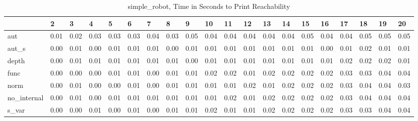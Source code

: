 \begin{table}
\centering
\caption{simple_robot, Time in Seconds to Print Reachability}
\label{simple_robot_states_time}
\begin{tabular}{llllllllllllllllllll}
\toprule
{} &     2 &     3 &     4 &     5 &     6 &     7 &     8 &     9 &    10 &    11 &    12 &    13 &    14 &    15 &    16 &    17 &    18 &    19 &    20 \\
\midrule
aut         &  0.01 &  0.02 &  0.03 &  0.03 &  0.03 &  0.04 &  0.03 &  0.05 &  0.04 &  0.04 &  0.04 &  0.04 &  0.04 &  0.05 &  0.04 &  0.04 &  0.05 &  0.05 &  0.05 \\
aut\_s       &  0.00 &  0.01 &  0.00 &  0.01 &  0.01 &  0.01 &  0.00 &  0.01 &  0.01 &  0.01 &  0.01 &  0.01 &  0.01 &  0.01 &  0.00 &  0.01 &  0.02 &  0.01 &  0.01 \\
depth       &  0.00 &  0.01 &  0.01 &  0.01 &  0.01 &  0.01 &  0.01 &  0.00 &  0.01 &  0.01 &  0.01 &  0.01 &  0.01 &  0.01 &  0.01 &  0.02 &  0.02 &  0.02 &  0.01 \\
func        &  0.00 &  0.00 &  0.00 &  0.01 &  0.01 &  0.00 &  0.01 &  0.01 &  0.02 &  0.02 &  0.01 &  0.02 &  0.02 &  0.02 &  0.02 &  0.03 &  0.03 &  0.04 &  0.04 \\
norm        &  0.00 &  0.01 &  0.00 &  0.00 &  0.01 &  0.00 &  0.01 &  0.01 &  0.01 &  0.01 &  0.02 &  0.01 &  0.02 &  0.02 &  0.02 &  0.03 &  0.04 &  0.04 &  0.03 \\
no\_internal &  0.00 &  0.01 &  0.00 &  0.01 &  0.01 &  0.01 &  0.01 &  0.01 &  0.01 &  0.02 &  0.01 &  0.02 &  0.02 &  0.02 &  0.02 &  0.03 &  0.04 &  0.04 &  0.04 \\
s\_var       &  0.00 &  0.00 &  0.01 &  0.00 &  0.01 &  0.00 &  0.01 &  0.01 &  0.02 &  0.01 &  0.01 &  0.02 &  0.02 &  0.02 &  0.02 &  0.03 &  0.03 &  0.04 &  0.04 \\
\bottomrule
\end{tabular}
\end{table}
